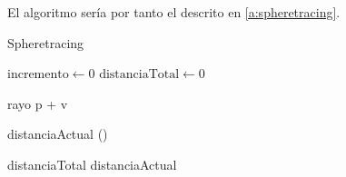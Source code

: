 El algoritmo sería por tanto el descrito en \autoref{a:spheretracing}. 
\begin{algorithm}[hbt!]\label{a:spheretracing}
    \caption{Spheretracing}\label{alg:spheretracing}
    $\text{incremento} \gets 0$\;
    $\text{distanciaTotal} \gets 0$\;
    
     {
        rayo \gets p + \cdot v\;
        
        distanciaActual \gets \phi()\;
        

        distanciaTotal \mathrel{{+}{=}} distanciaActual\;

    }
\end{algorithm}

